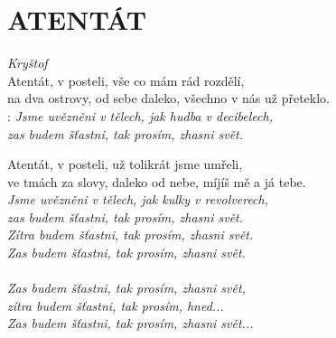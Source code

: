 \section*{\Huge ATENTÁT}
\emph{Kryštof}\\

Atentát, v posteli, vše co mám rád rozdělí,\\
na dva ostrovy, od sebe daleko, všechno v nás už přeteklo.\\

\textregistered:
\emph{
Jsme uvězněni v tělech, jak hudba v decibelech, \hspace{0.6cm}\\
zas budem šťastni, tak prosím, zhasni svět.\\
}

Atentát, v posteli, už tolikrát jsme umřeli,\\
ve tmách za slovy, daleko od nebe, míjíš mě a já tebe.\\

\emph{
Jsme uvězněni v tělech, jak kulky v revolverech,\\
zas budem šťastni, tak prosím, zhasni svět.\\
Zítra budem šťastni, tak prosím, zhasni svět.\\
Zas budem šťastni, tak prosím, zhasni svět.\\
\\
Zas budem šťastni, tak prosím, zhasni svět,\\
zítra budem šťastni, tak prosím, hned...\\
Zas budem šťastni, tak prosím, zhasni svět...}

\newpage
